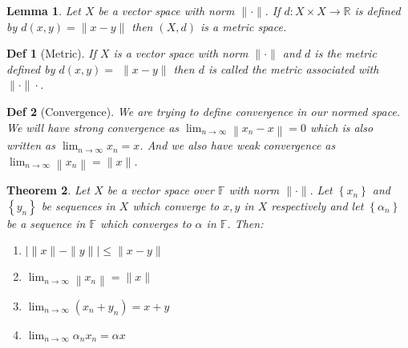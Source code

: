 \documentclass[10pt]{paper}
\newtheorem{theorem}{Theorem}[section]
\newtheorem{definition}{Def}[section]
\newtheorem{lemma}[theorem]{Lemma}
\begin{document}

\begin{lemma}
    Let $X$ be a vector space with norm $\|\cdot\| .$ If $d: X \times X \rightarrow \mathbb{R}$ is defined by $d(x, y)=\|x-y\|$ then $(X, d)$ is a metric space.
\end{lemma}

\begin{definition}[Metric]
    If $X$ is a vector space with norm $\|\cdot\|$ and $d$ is the metric defined by $d(x, y)=$ $\|x-y\|$ then $d$ is called the metric associated with $\|\cdot\| \cdot$.
\end{definition}

\begin{definition}[Convergence]
    We are trying to define convergence in our normed space. We will have strong convergence as $\lim _{n \rightarrow \infty}\left\|x_{n} - x\right\|=0$ which is also written as $\lim _{n \rightarrow \infty}x_{n}=x$. And we also have weak convergence as $\lim _{n \rightarrow \infty}\left\|x_{n}\right\|=\|x\|$.
\end{definition}

\begin{theorem}
    Let $X$ be a vector space over $\mathbb{F}$ with norm $\|\cdot\| .$ Let $\left\{x_{n}\right\}$ and $\left\{y_{n}\right\}$ be sequences in $X$ which converge to $x, y$ in $X$ respectively and let $\left\{\alpha_{n}\right\}$ be a sequence in $\mathbb{F}$ which converges to $\alpha$ in $\mathbb{F}$. Then:
    \begin{enumerate}
        \item $|\|x\|-\|y\|| \leq\|x-y\|$
        \item $\lim _{n \rightarrow \infty}\left\|x_{n}\right\|=\|x\|$
        \item $\lim _{n \rightarrow \infty}\left(x_{n}+y_{n}\right)=x+y$
        \item $\lim _{n \rightarrow \infty} \alpha_{n} x_{n}=\alpha x$
    \end{enumerate}

\end{theorem}
\end{document}
